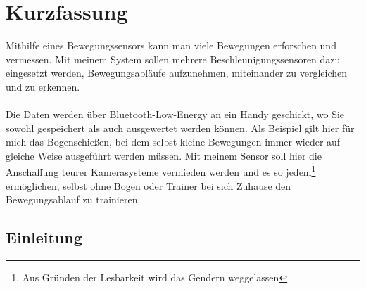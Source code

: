 \chapter[Kurzfassung]{Kurzfassung}

Mithilfe eines Bewegungssensors kann man viele 
Bewegungen erforschen und vermessen.
Mit meinem System sollen mehrere Beschleunigungssensoren 
dazu eingesetzt werden, Bewegungsabläufe aufzunehmen, 
miteinander zu vergleichen und zu erkennen.\\
\\
Die Daten werden über Bluetooth-Low-Energy an ein Handy 
geschickt, wo Sie sowohl gespeichert als auch ausgewertet 
werden können. Als Beispiel gilt hier für mich das Bogenschießen, 
bei dem selbst kleine Bewegungen immer wieder auf gleiche Weise 
ausgeführt werden müssen. Mit meinem Sensor soll hier die Anschaffung teurer 
Kamerasysteme vermieden werden und es so jedem\footnote{Aus Gründen der Lesbarkeit wird das Gendern weggelassen} ermöglichen, 
selbst ohne Bogen oder Trainer bei sich Zuhause
den Bewegungsablauf zu trainieren.\\

\section{Einleitung}
